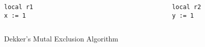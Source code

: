 \documentclass{beamer}
\begin{document}
\begin{frame}[fragile]
\begin{columns}[onlytextwidth]
\begin{column}{.4\textwidth}
\begin{verbatim}
local r1
x := 1
\end{verbatim}
\end{column}
\begin{column}{.05\textwidth}
\end{column}
\begin{column}{.4\textwidth}
\begin{verbatim}
local r2
y := 1
\end{verbatim}
\end{column}
\end{columns}
\begin{center}
Dekker's Mutal Exclusion Algorithm
\end{center}
\end{frame} 
\end{document}
